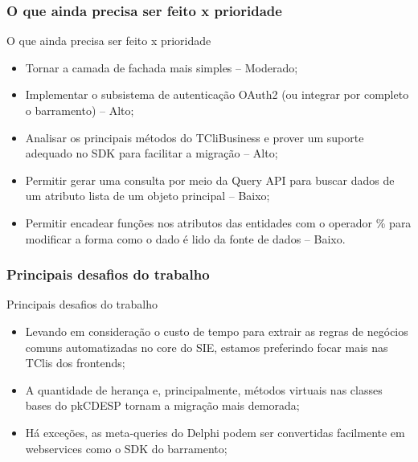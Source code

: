 \documentclass{beamer}
\begin{document}
\begin{frame}
\frametitle{O que ainda precisa ser feito x prioridade}

\begin{exampleblock}{O que ainda precisa ser feito x prioridade}
	
	\begin{itemize}
		\item<1->Tornar a camada de fachada mais simples -- Moderado;
		\item<1->Implementar o subsistema de autenticação OAuth2 (ou integrar por completo o barramento) -- Alto;
		\item<1->Analisar os principais métodos do TCliBusiness e prover um suporte adequado no SDK para facilitar a migração -- Alto;
		\item<1->Permitir gerar uma consulta por meio da Query API para buscar dados de um atributo lista de um objeto principal -- Baixo;
		\item<1->Permitir encadear funções nos atributos das entidades com o operador \% para modificar a forma como o dado é lido da fonte de dados -- Baixo.
		
		
	\end{itemize}
	
\end{exampleblock}







\end{frame}


\begin{frame}
\frametitle{Principais desafios do trabalho}

\begin{exampleblock}{Principais desafios do trabalho}
	\small{
	\begin{itemize}
		\item<1->Levando em consideração o custo de tempo para extrair as regras de negócios comuns automatizadas no core do SIE, estamos preferindo focar mais nas TClis dos frontends;
		\item<1->A quantidade de herança e, principalmente, métodos virtuais nas classes bases do pkCDESP tornam a migração mais demorada;
		\item<1->Há exceções, as meta-queries do Delphi podem ser convertidas facilmente em webservices como o SDK do barramento;
	\end{itemize}
}
\end{exampleblock}

\end{frame}
\end{document}
